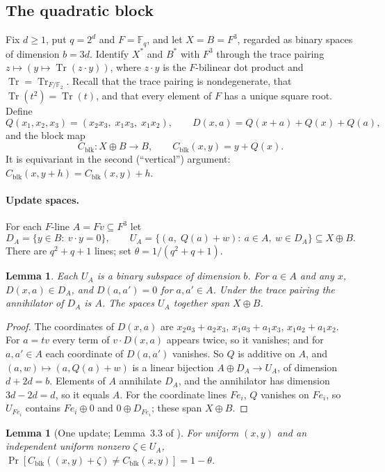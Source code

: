 \documentclass[11pt]{article}
\newtheorem{lemma}[theorem]{Lemma}
\theoremstyle{definition}
\theoremstyle{remark}
\newcommand{\F}{\mathbb F}
\DeclareMathOperator{\Tr}{Tr}
\begin{document}
\subsection{The quadratic block}\label{sec:block}

Fix $d\ge1$, put $q=2^d$ and $F=\F_q$, and let $X=B=F^3$, regarded as binary
spaces of dimension $b=3d$. Identify $X^*$ and $B^*$ with $F^3$ through the
trace pairing $z\mapsto(y\mapsto\Tr(z\cdot y))$, where $z\cdot y$ is the
$F$-bilinear dot product and $\Tr=\Tr_{F/\F_2}$. Recall that the trace
pairing is nondegenerate, that $\Tr(t^2)=\Tr(t)$, and that every element of $F$
has a unique square root. Define
\[
Q(x_1,x_2,x_3)=(x_2x_3,\;x_1x_3,\;x_1x_2),\qquad
D(x,a)=Q(x+a)+Q(x)+Q(a),
\]
and the block map
\[
C_{\mathrm{blk}}\colon X\oplus B\to B,\qquad C_{\mathrm{blk}}(x,y)=y+Q(x).
\]
It is equivariant in the second (``vertical'') argument:
$C_{\mathrm{blk}}(x,y+h)=C_{\mathrm{blk}}(x,y)+h$.

\paragraph{Update spaces.} For each $F$-line $A=Fv\subseteq F^3$ let
\[
D_A=\{y\in B:\ v\cdot y=0\},\qquad
U_A=\{(a,\;Q(a)+w):\ a\in A,\ w\in D_A\}\subseteq X\oplus B .
\]
There are $q^2+q+1$ lines; set $\theta=1/(q^2+q+1)$.

\begin{lemma}\label{lem:block-basic}
Each $U_A$ is a binary subspace of dimension $b$. For $a\in A$ and any $x$,
$D(x,a)\in D_A$, and $D(a,a')=0$ for $a,a'\in A$. Under the trace pairing the
annihilator of $D_A$ is $A$. The spaces $U_A$ together span $X\oplus B$.
\end{lemma}

\begin{proof}
The coordinates of $D(x,a)$ are $x_2a_3+a_2x_3$, $x_1a_3+a_1x_3$,
$x_1a_2+a_1x_2$. For $a=tv$ every term of $v\cdot D(x,a)$ appears twice, so
it vanishes; and for $a,a'\in A$ each coordinate of $D(a,a')$ vanishes. So $Q$
is additive on $A$, and $(a,w)\mapsto(a,Q(a)+w)$ is a linear bijection
$A\oplus D_A\to U_A$, of dimension $d+2d=b$. Elements of $A$ annihilate $D_A$,
and the annihilator has dimension $3d-2d=d$, so it equals $A$. For the
coordinate lines $Fe_i$, $Q$ vanishes on $Fe_i$, so $U_{Fe_i}$ contains
$Fe_i\oplus0$ and $0\oplus D_{Fe_i}$; these span $X\oplus B$.
\end{proof}

\begin{lemma}[One update; Lemma~3.3 of \cite{OpenAI-UGC}]\label{lem:block-noise}
For uniform $(x,y)$ and an independent uniform nonzero $\zeta\in U_A$,
$\Pr[C_{\mathrm{blk}}((x,y)+\zeta)\ne C_{\mathrm{blk}}(x,y)]=1-\theta$.
\end{lemma}
\end{document}
